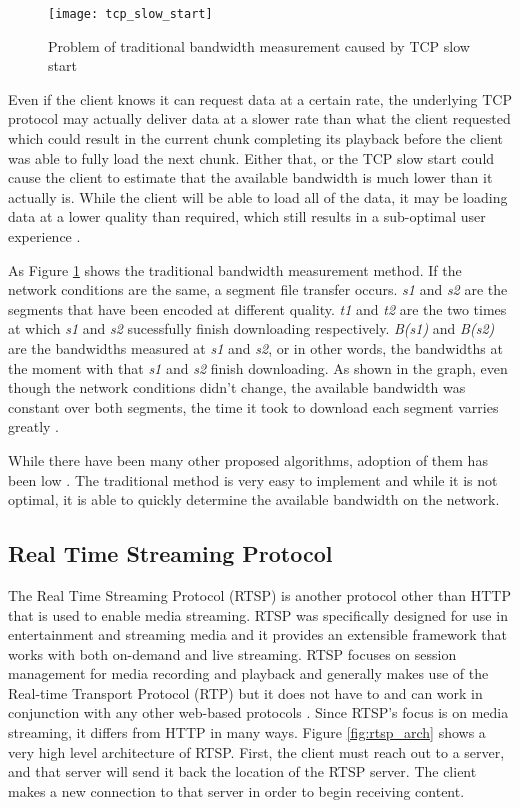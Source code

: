 \documentclass[12pt]{article}
\begin{document}
\begin{figure}[h]
  \begin{center}
    \texttt{[image: tcp\_slow\_start]}
    \caption{Problem of traditional bandwidth measurement caused by TCP slow start}
    \label{fig:tcp_slow_start}
  \end{center}
\end{figure}

Even if the client knows it can request data at a certain rate, the underlying TCP protocol may actually deliver data at a slower rate than what the client requested which could result in the current chunk completing its playback before the client was able to fully load the next chunk.  Either that, or the TCP slow start could cause the client to estimate that the available bandwidth is much lower than it actually is.  While the client will be able to load all of the data, it may be loading data at a lower quality than required, which still results in a sub-optimal user experience \cite{7057917}.

As Figure \ref{fig:tcp_slow_start} shows the traditional bandwidth measurement method.  If the network conditions are the same, a segment file transfer occurs. \textit{s1} and \textit{s2} are the segments that have been encoded at different quality.  \textit{t1} and \textit{t2} are the two times at which \textit{s1} and \textit{s2} sucessfully finish downloading respectively. \textit{B(s1)} and \textit{B(s2)} are the bandwidths measured at \textit{s1} and \textit{s2}, or in other words, the bandwidths at the moment with that \textit{s1} and \textit{s2} finish downloading.  As shown in the graph, even though the network conditions didn't change, the available bandwidth was constant over both segments, the time it took to download each segment varries greatly \cite{7057917}.

While there have been many other proposed algorithms, adoption of them has been low \cite{6698072}\cite{7057917}.  The traditional method is very easy to implement and while it is not optimal, it is able to quickly determine the available bandwidth on the network.

\subsection{Real Time Streaming Protocol}
The Real Time Streaming Protocol (RTSP) is another protocol other than HTTP that is used to enable media streaming.  RTSP was specifically designed for use in entertainment and streaming media and it provides an extensible framework that works with both on-demand and live streaming.  RTSP focuses on session management for media recording and playback and generally makes use of the Real-time Transport Protocol (RTP) but it does not have to and can work in conjunction with any other web-based protocols \cite{rtsp_ieee}.  Since RTSP's focus is on media streaming, it differs from HTTP in many ways.  Figure \ref{fig:rtsp_arch} shows a very high level architecture of RTSP.  First, the client must reach out to a server, and that server will send it back the location of the RTSP server.  The client makes a new connection to that server in order to begin receiving content.
\end{document}
